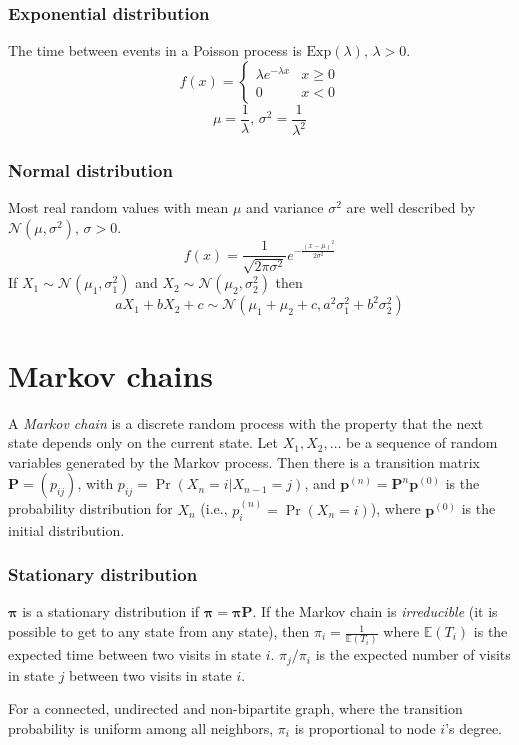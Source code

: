 \subsubsection{Exponential distribution}
The time between events in a Poisson process is $\textrm{Exp}(\lambda),\,\lambda>0$.
\[f(x) = \left\{
\begin{array}{cl}
\lambda e^{-\lambda x} & x\geq0\\
0 & x<0
\end{array}\right.\]
\[\mu=\frac{1}{\lambda},\,\sigma^2=\frac{1}{\lambda^2}\]

\subsubsection{Normal distribution}
Most real random values with mean $\mu$ and variance $\sigma^2$ are well described by $\mathcal{N}(\mu,\sigma^2),\,\sigma>0$.
\[ f(x) = \frac{1}{\sqrt{2\pi\sigma^2}}e^{-\frac{(x-\mu)^2}{2\sigma^2}} \]
If $X_1 \sim \mathcal{N}(\mu_1,\sigma_1^2)$ and $X_2 \sim \mathcal{N}(\mu_2,\sigma_2^2)$ then
\[ aX_1 + bX_2 + c \sim \mathcal{N}(\mu_1+\mu_2+c,a^2\sigma_1^2+b^2\sigma_2^2) \]

\section{Markov chains}
A \emph{Markov chain} is a discrete random process with the property that the next state depends only on the current state.
Let $X_1,X_2,\ldots$ be a sequence of random variables generated by the Markov process.
Then there is a transition matrix $\mathbf{P} = (p_{ij})$, with $p_{ij} = \Pr(X_n = i | X_{n-1} = j)$,
and $\mathbf{p}^{(n)} = \mathbf P^n \mathbf p^{(0)}$ is the probability distribution for $X_n$ (i.e., $p^{(n)}_i = \Pr(X_n = i)$),
where $\mathbf{p}^{(0)}$ is the initial distribution.

\subsubsection{Stationary distribution}
$\mathbf{\pi}$ is a stationary distribution if $\mathbf{\pi} = \mathbf{\pi P}$.
If the Markov chain is \emph{irreducible} (it is possible to get to any state from any state),
then $\pi_i = \frac{1}{\mathbb{E}(T_i)}$ where $\mathbb{E}(T_i)$  is the expected time between two visits in state $i$.
$\pi_j/\pi_i$ is the expected number of visits in state $j$ between two visits in state $i$.

For a connected, undirected and non-bipartite graph, where the transition probability is uniform among all neighbors, $\pi_i$ is proportional to node $i$'s degree.

